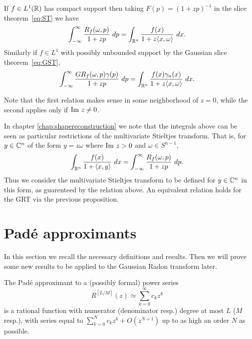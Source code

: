  
\begin{proposition}
If $f \in L^1(\mathbb{R})$ has compact support then taking $F(p) = {(1+zp)}^{-1}$ in the slice theorem~\ref{eq:ST} we have
\[
  \int_{-\infty}^\infty \frac{R_f(\omega, p)}{1 + zp} ~dp = \int_{\mathbb{R}^n} \frac{f(x)}{1 + z\langle x, \omega \rangle} ~dx.
\]
Similarly if $f \in L^1$ with possibly unbounded support by the Gaussian slice theorem~\ref{eq:GST},
\[
  \int_{-\infty}^\infty \frac{GR_f(\omega, p) \gamma(p)}{1 + zp} ~dp = \int_{\mathbb{R}^n} \frac{f(x)\gamma_n(x)}{1 + z\langle x, \omega \rangle} ~dx.
\]
\end{proposition}

Note that the first relation makes sense in some neighborhood of $z = 0$, while the second applies only if $\text{Im}~ z \neq 0$.

In chapter \ref{chap:shapereconstruction} we note that the integrals above can be seen as particular restrictions of the multivariate Stieltjes transform. That is, for $y \in \mathbb{C}^n$ of the form $y = z\omega$ where $\text{Im}~ z > 0$ and $\omega \in S^{n - 1}$,
\[
  \int_{\mathbb{R}^n} \frac{f(x)}{1 + \left\langle x, y \right\rangle} ~dx = \int_{-\infty}^\infty \frac{R_f(\omega, p)}{1 + zp} ~dp.
\]
Thus we consider the multivariate Stieltjes transform to be defined for $y \in \mathbb{C}^n$ in this form, as guarenteed by the relation above. An equivalent relation holds for the GRT via the previous proposition.

\section{Pad\'e approximants}\label{sec:pade}

In this section we recall the necessary definitions and results. Then we will prove some new results to be applied to the Gaussian Radon transform later.

\begin{definition}
  The Pad\'e approximant to a (possibly formal) power series 
  \[
    R^{[L/M]}(z) \simeq \sum_{k=0}^\infty c_k z^k
  \]
  is a rational function with numerator (denominator resp.) degree at most $L$ ($M$ resp.), with series equal to $\sum_{k=0}^N c_k z^k + O(z^{N+1})$ up to as high an order $N$ as possible. 
\end{definition}

